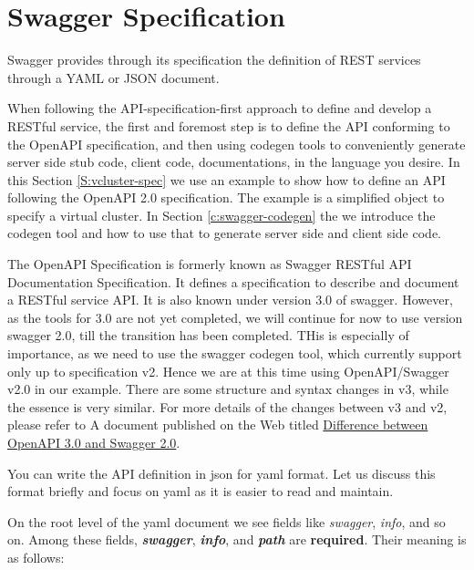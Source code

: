 \section{Swagger Specification}
\label{S:swagger-specification}

Swagger provides through its specification the definition of REST
services through a YAML or JSON document. 

When following the API-specification-first approach to define and
develop a RESTful service, the first and foremost step is to define
the API conforming to the OpenAPI specification, and then using
codegen tools to conveniently generate server side stub code, client
code, documentations, in the language you desire. In this Section
\ref{S:vcluster-spec} we use an example to show how to define an API
following the OpenAPI 2.0 specification. The example is a simplified
object to specify a virtual cluster. In Section
\ref{c:swagger-codegen} the we introduce the codegen tool and how to
use that to generate server side and client side code.

The OpenAPI Specification is formerly known as Swagger RESTful API
Documentation Specification. It defines a specification to describe
and document a RESTful service API. It is also known under version 3.0
of swagger. However, as the tools for 3.0 are not yet completed, we
will continue for now to use version swagger 2.0, till the transition
has been completed. THis is especially of importance, as we need to
use the swagger codegen tool, which currently support only up to
specification v2. Hence we are at this time using OpenAPI/Swagger v2.0
in our example. There are some structure and syntax changes in v3,
while the essence is very similar. For more details of the
changes between v3 and v2, please refer to A document published on the
Web titled
\href{https://blog.readme.io/an-example-filled-guide-to-swagger-3-2/}{Difference
  between OpenAPI 3.0 and Swagger 2.0}.

You can write the API definition in json for yaml format. Let us
discuss this format briefly and focus on yaml as it is easier to read
and maintain.

On the root level of the yaml document we see fields like
\emph{swagger}, \emph{info}, and so on. Among these fields,
\textbf{\emph{swagger}}, \textbf{\emph{info}}, and \textbf{\emph{path}}
are \textbf{required}. Their meaning is as follows:

